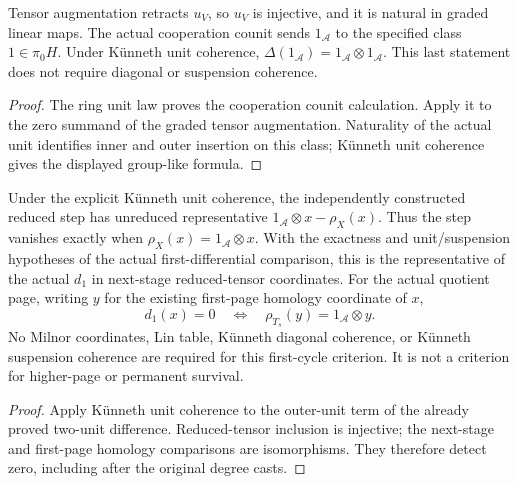 \begin{proposition}
  \label{prop:h6-cooperation-unit-laws}
  \leanok
  Tensor augmentation retracts $u_V$, so $u_V$ is injective, and it is
  natural in graded linear maps. The actual cooperation counit sends
  $1_{\mathcal A}$ to the specified class $1\in\pi_0H$.
  Under K\"unneth unit coherence,
  $\Delta(1_{\mathcal A})=1_{\mathcal A}\otimes1_{\mathcal A}$.
  This last statement does not require diagonal or suspension coherence.
\end{proposition}
\begin{proof}
  The ring unit law proves the cooperation counit calculation. Apply it
  to the zero summand of the graded tensor augmentation. Naturality of
  the actual unit identifies inner and outer insertion on this class;
  K\"unneth unit coherence gives the displayed group-like formula.
  \leanok
\end{proof}

\begin{proposition}
  \label{prop:h6-first-cycle-coaction}
  \leanok
  Under the explicit K\"unneth unit coherence, the independently
  constructed reduced step has unreduced representative
  $1_{\mathcal A}\otimes x-\rho_X(x)$. Thus the step vanishes exactly when
  $\rho_X(x)=1_{\mathcal A}\otimes x$.
  With the exactness and unit/suspension hypotheses of the actual
  first-differential comparison, this is the representative of the actual
  $d_1$ in next-stage reduced-tensor coordinates. For the actual quotient
  page, writing $y$ for the existing first-page homology coordinate of $x$,
  \[
    d_1(x)=0\quad\Longleftrightarrow\quad
    \rho_{T_s}(y)=1_{\mathcal A}\otimes y.
  \]
  No Milnor coordinates, Lin table, K\"unneth diagonal coherence, or
  K\"unneth suspension coherence are required for this first-cycle
  criterion. It is not a criterion for higher-page or permanent survival.
\end{proposition}
\begin{proof}
  Apply K\"unneth unit coherence to the outer-unit term of the already
  proved two-unit difference. Reduced-tensor inclusion is injective;
  the next-stage and first-page homology comparisons are isomorphisms.
  They therefore detect zero, including after the original degree casts.
  \leanok
\end{proof}

